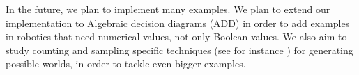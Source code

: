 In the future, we plan to implement many examples. We plan to extend our implementation to Algebraic decision diagrams (ADD) \cite{DBLP:journals/fmsd/BaharFGHMPS97} in order to add examples in robotics that need numerical values, not only Boolean values.
%
We also aim to study counting and sampling specific techniques (see for instance \citet{DBLP:conf/aaai/MeelVCFSFIM16}) for generating possible worlds, in order to tackle even bigger examples.

